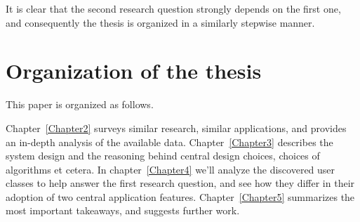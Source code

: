 It is clear that the second research question strongly depends on the first one, and consequently the thesis is organized in a similarly stepwise manner.

\section{Organization of the thesis}
\label{sec:thesis_organization}

This paper is organized as follows.

Chapter~\ref{Chapter2} surveys similar research, similar applications, and provides an in-depth analysis of the available data.
Chapter~\ref{Chapter3} describes the system design and the reasoning behind central design choices, choices of algorithms et cetera.
In chapter~\ref{Chapter4} we'll analyze the discovered user classes to help answer the first research question, and see how they differ in their adoption of two central application features.
Chapter~\ref{Chapter5} summarizes the most important takeaways, and suggests further work.

